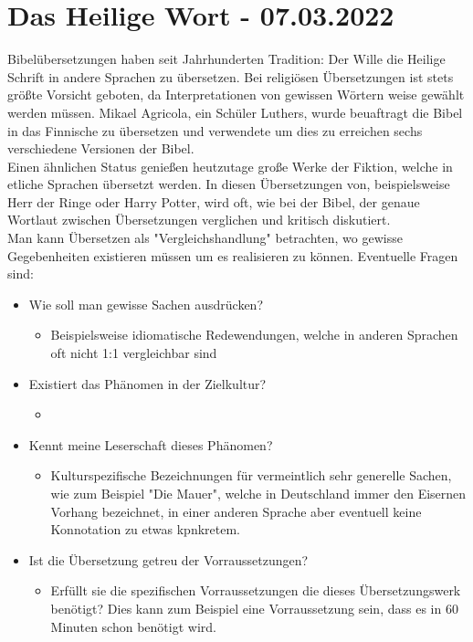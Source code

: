 \documentclass{article}
\begin{document}
	\section{Das Heilige Wort - 07.03.2022}
	Bibelübersetzungen haben seit Jahrhunderten Tradition: Der Wille die Heilige Schrift in andere Sprachen zu übersetzen. Bei religiösen Übersetzungen ist stets größte Vorsicht geboten, da Interpretationen von gewissen Wörtern weise gewählt werden müssen. Mikael Agricola, ein Schüler Luthers, wurde beuaftragt die Bibel in das Finnische zu übersetzen und verwendete um dies zu erreichen sechs verschiedene Versionen der Bibel. \\
	Einen ähnlichen Status genießen heutzutage große Werke der Fiktion, welche in etliche Sprachen übersetzt werden. In diesen Übersetzungen von, beispielsweise Herr der Ringe oder Harry Potter, wird oft, wie bei der Bibel, der genaue Wortlaut zwischen Übersetzungen verglichen und kritisch diskutiert. \\
	Man kann Übersetzen als "Vergleichshandlung" betrachten, wo gewisse Gegebenheiten existieren müssen um es realisieren zu können. Eventuelle Fragen sind:
	\begin{itemize}
		\item{Wie soll man gewisse Sachen ausdrücken?}
		\begin{itemize}
			\item{Beispielsweise idiomatische Redewendungen, welche in anderen Sprachen oft nicht 1:1 vergleichbar sind}
		\end{itemize}
		\item{Existiert das Phänomen in der Zielkultur?}
		\begin{itemize}
			\item{}
		\end{itemize}
		\item{Kennt meine Leserschaft dieses Phänomen?}
		\begin{itemize}
			\item{Kulturspezifische Bezeichnungen für vermeintlich sehr generelle Sachen, wie zum Beispiel "Die Mauer", welche in Deutschland immer den Eisernen Vorhang bezeichnet, in einer anderen Sprache aber eventuell keine Konnotation zu etwas kpnkretem.}
		\end{itemize}
		\item{Ist die Übersetzung getreu der Vorraussetzungen?}
		\begin{itemize}
			\item{Erfüllt sie die spezifischen Vorraussetzungen die dieses Übersetzungswerk benötigt? Dies kann zum Beispiel eine Vorraussetzung sein, dass es in 60 Minuten schon benötigt wird.}
		\end{itemize}
	\end{itemize}
\end{document}
